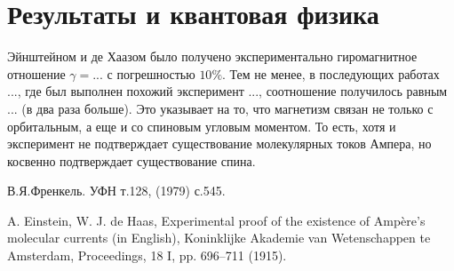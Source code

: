 \documentclass[a4paper]{article}
\begin{document}
\section*{Результаты и квантовая физика}
Эйнштейном и де Хаазом было получено экспериментально гиромагнитное отношение $\gamma=...$ с погрешностью $10 \%$. Тем не менее, в последующих работах ..., где был выполнен похожий эксперимент ..., соотношение получилось равным ... (в два раза больше). Это указывает на то, что магнетизм связан не только с орбитальным, а еще и со спиновым угловым моментом. То есть, хотя и эксперимент не подтверждает существование молекулярных токов Ампера, но косвенно подтверждает существование спина.
\begin{thebibliography}{}
\item В.Я.Френкель. УФН т.128, (1979) с.545.
\item A. Einstein, W. J. de Haas, Experimental proof of the existence of Ampère's molecular currents (in English), Koninklijke Akademie van Wetenschappen te Amsterdam, Proceedings, 18 I, pp. 696–711 (1915).
\end{thebibliography}
\end{document}
